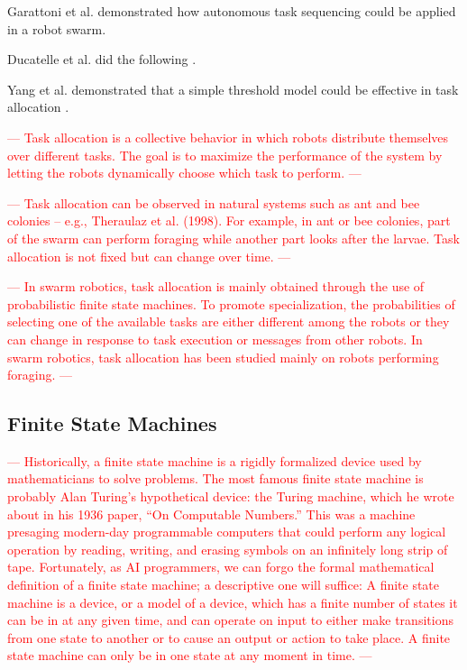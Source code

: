 Garattoni et al. \cite{garattoni2018autonomous} demonstrated how autonomous task sequencing could be applied in a robot swarm.

Ducatelle et al. did the following \cite{ducatelle2009new}.

Yang et al. demonstrated that a simple threshold model could be effective in task allocation \cite{yang2009swarm}.

\textcolor{red}{---
Task allocation is a collective behavior in which robots distribute themselves over different tasks. 
The goal is to maximize the performance of the system by letting the robots dynamically choose which task to perform.
---}

\textcolor{red}{---
Task allocation can be observed in natural systems such as ant and bee colonies – e.g., Theraulaz et al. (1998). 
For example, in ant or bee colonies, part of the swarm can perform foraging while another part looks after the larvae. 
Task allocation is not fixed but can change over time.
---}

\textcolor{red}{---
In swarm robotics, task allocation is mainly obtained through the use of probabilistic finite state machines. 
To promote specialization, 
the probabilities of selecting one of the available tasks are either different among the robots or they can change in response to task execution or messages from other robots. 
In swarm robotics, task allocation has been studied mainly on robots performing foraging.
---}

\subsection{Finite State Machines} \label{subsection:FSM}
\textcolor{red}{---
Historically, a finite state machine is a rigidly formalized device used by mathematicians to solve problems. 
The most famous finite state machine is probably Alan Turing’s hypothetical device: 
the Turing machine, 
which he wrote about in his 1936 paper, 
“On Computable Numbers.” 
This was a machine presaging modern-day programmable computers that could perform any logical operation by reading, writing, 
and erasing symbols on an infinitely long strip of tape. 
Fortunately, as AI programmers, we can forgo the formal mathematical definition of a finite state machine; 
a descriptive one will suffice:
A finite state machine is a device, or a model of a device, 
which has a finite number of states it can be in at any given time, 
and can operate on input to either make transitions from one state to another or to cause an output or action to take place. 
A finite state machine can only be in one state at any moment in time.
---}

